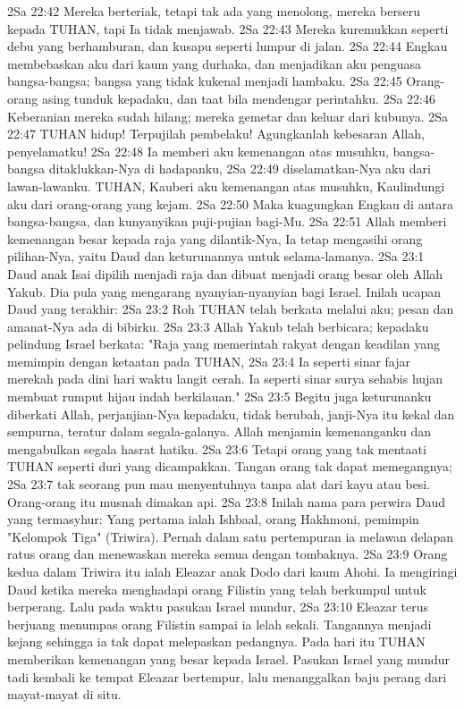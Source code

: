 2Sa 22:42  Mereka berteriak, tetapi tak ada yang menolong, mereka berseru kepada TUHAN, tapi Ia tidak menjawab.
2Sa 22:43  Mereka kuremukkan seperti debu yang berhamburan, dan kusapu seperti lumpur di jalan.
2Sa 22:44  Engkau membebaskan aku dari kaum yang durhaka, dan menjadikan aku penguasa bangsa-bangsa; bangsa yang tidak kukenal menjadi hambaku.
2Sa 22:45  Orang-orang asing tunduk kepadaku, dan taat bila mendengar perintahku.
2Sa 22:46  Keberanian mereka sudah hilang; mereka gemetar dan keluar dari kubunya.
2Sa 22:47  TUHAN hidup! Terpujilah pembelaku! Agungkanlah kebesaran Allah, penyelamatku!
2Sa 22:48  Ia memberi aku kemenangan atas musuhku, bangsa-bangsa ditaklukkan-Nya di hadapanku,
2Sa 22:49  diselamatkan-Nya aku dari lawan-lawanku. TUHAN, Kauberi aku kemenangan atas musuhku, Kaulindungi aku dari orang-orang yang kejam.
2Sa 22:50  Maka kuagungkan Engkau di antara bangsa-bangsa, dan kunyanyikan puji-pujian bagi-Mu.
2Sa 22:51  Allah memberi kemenangan besar kepada raja yang dilantik-Nya, Ia tetap mengasihi orang pilihan-Nya, yaitu Daud dan keturunannya untuk selama-lamanya.
2Sa 23:1  Daud anak Isai dipilih menjadi raja dan dibuat menjadi orang besar oleh Allah Yakub. Dia pula yang mengarang nyanyian-nyanyian bagi Israel. Inilah ucapan Daud yang terakhir:
2Sa 23:2  Roh TUHAN telah berkata melalui aku; pesan dan amanat-Nya ada di bibirku.
2Sa 23:3  Allah Yakub telah berbicara; kepadaku pelindung Israel berkata: "Raja yang memerintah rakyat dengan keadilan yang memimpin dengan ketaatan pada TUHAN,
2Sa 23:4  Ia seperti sinar fajar merekah pada dini hari waktu langit cerah. Ia seperti sinar surya sehabis hujan membuat rumput hijau indah berkilauan."
2Sa 23:5  Begitu juga keturunanku diberkati Allah, perjanjian-Nya kepadaku, tidak berubah, janji-Nya itu kekal dan sempurna, teratur dalam segala-galanya. Allah menjamin kemenanganku dan mengabulkan segala hasrat hatiku.
2Sa 23:6  Tetapi orang yang tak mentaati TUHAN seperti duri yang dicampakkan. Tangan orang tak dapat memegangnya;
2Sa 23:7  tak seorang pun mau menyentuhnya tanpa alat dari kayu atau besi. Orang-orang itu musnah dimakan api.
2Sa 23:8  Inilah nama para perwira Daud yang termasyhur: Yang pertama ialah Ishbaal, orang Hakhmoni, pemimpin "Kelompok Tiga" (Triwira). Pernah dalam satu pertempuran ia melawan delapan ratus orang dan menewaskan mereka semua dengan tombaknya.
2Sa 23:9  Orang kedua dalam Triwira itu ialah Eleazar anak Dodo dari kaum Ahohi. Ia mengiringi Daud ketika mereka menghadapi orang Filistin yang telah berkumpul untuk berperang. Lalu pada waktu pasukan Israel mundur,
2Sa 23:10  Eleazar terus berjuang menumpas orang Filistin sampai ia lelah sekali. Tangannya menjadi kejang sehingga ia tak dapat melepaskan pedangnya. Pada hari itu TUHAN memberikan kemenangan yang besar kepada Israel. Pasukan Israel yang mundur tadi kembali ke tempat Eleazar bertempur, lalu menanggalkan baju perang dari mayat-mayat di situ.
